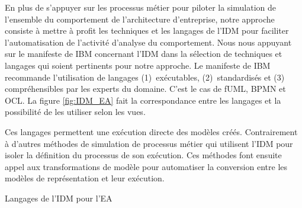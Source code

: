 En plus de s'appuyer sur les processus métier pour piloter la simulation de
l'ensemble du comportement de l'architecture d'entreprise, notre approche
consiste à mettre à profit les techniques et les langages de l'IDM pour
faciliter l'automatisation de l'activité d'analyse du comportement. Nous nous
appuyant sur le manifeste de IBM \cite{chesbrough2006research} concernant l'IDM
dans la sélection de techniques et langages qui soient pertinents pour notre
approche. Le manifeste de IBM recommande l'utilisation de langages
(1)~exécutables, (2)~standardisés et (3) compréhensibles par les experts du
domaine. C'est le cas de fUML, BPMN et OCL. La figure \ref{fig:IDM_EA} fait la
correspondance entre les langages et la possibilité de les utiliser selon les
vues.


Ces langages permettent une exécution directe des modèles créés. Contrairement à
d'autres méthodes de simulation de processus métier qui utilisent l'IDM pour
isoler la définition du processus de son exécution. Ces méthodes font ensuite
appel aux transformations de modèle pour automatiser la conversion entre les
modèles de représentation et leur exécution.

\begin{table}[!ht]
    \begin{center}
        
    \end{center}
    \caption{Langages de l'IDM pour l'EA}
    \label{fig:IDM_EA}
\end{table}

        
























